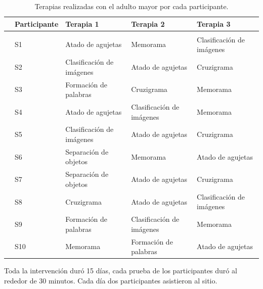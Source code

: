 \begin{table}[h]
	\footnotesize
	\centering
	\caption{Terapias realizadas con el adulto mayor por cada participante.}
	\label{table:therapies}
	\begin{tabular}{m{0.2cm}m{2.5cm}m{2.5cm}m{2.5cm}m{2.5cm}}
		\hline\noalign{\smallskip}
	&\textbf{Participante}&  \textbf{Terapia 1}& \textbf{Terapia 2}   & \textbf{Terapia 3}  \\ \hline
		\\ \noalign{\smallskip}
		&S1&  Atado de agujetas& Memorama & Clasificaci\'on de im\'agenes   \\ 
  &S2&  Clasificaci\'on de im\'agenes& Atado de agujetas & Cruzigrama   \\ 
  &S3&  Formaci\'on de palabras& Cruzigrama & Memorama    \\ 
  &S4&  Atado de agujetas& Clasificaci\'on de im\'agenes & Memorama   \\ 
  & S5&  Clasificaci\'on de im\'agenes&  Atado de agujetas & Cruzigrama   \\ 
  &S6&  Separaci\'on de objetos& Memorama & Atado de agujetas   \\ 
  &S7&  Separaci\'on de objetos & Atado de agujetas & Cruzigrama   \\ 
  &S8&  Cruzigrama& Atado de agujetas & Clasificaci\'on de im\'agenes   \\ 
  &S9&  Formaci\'on de palabras& Clasificaci\'on de im\'agenes & Memorama   \\ 
  &S10&  Memorama& Formaci\'on de palabras & Atado de agujetas   \\ 
		\hline
	\end{tabular}
\end{table}

Toda la intervenci\'on dur\'o 15 d\'ias, cada prueba de los participantes dur\'o al rededor de 30 minutos. Cada d\'ia dos participantes asistieron al sitio.


